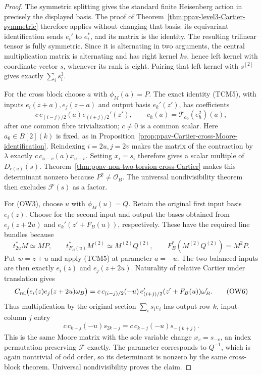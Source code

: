 \begin{proof}
The symmetric splitting gives the standard finite Heisenberg action
in precisely the displayed basis.  The proof of
Theorem~\ref{thm:ppav-level3-Cartier-symmetric} therefore applies
without changing that basis: its equivariant identification sends
\(e_i'\) to \(e_i^*\), and its matrix is the identity.  The resulting
trilinear tensor is fully symmetric.  Since it is alternating in
two arguments, the central multiplication matrix is alternating and
has right kernel \(ks\), hence left kernel with coordinate vector
\(s\), whenever its rank is eight.  Pairing that left kernel with
\(s^{[2]}\) gives exactly \(\sum_i s_i^3\).

For the cross block choose \(a\) with \(\phi_M(a)=P\).  The exact
identity (TCM5), with inputs \(e_i(z+a),e_j(z-a)\) and output basis
\(e_k'(z')\), has coefficients
\[
 c\,c_{(i-j)/2}(a)e_{(i+j)/2}'(z'),
 \qquad
 c_h(a)=\mathcal T_{a_0}(e_h^2)(a),
 \tag{OW4}
\]
after one common fibre trivialization; \(c\ne0\) is a common scalar.
Here \(a_0\in B[2](k)\) is fixed, as in
Proposition~\ref{prop:ppav-Cartier-cross-Moore-identification}.
Reindexing \(i=2u,j=2v\) makes the matrix of the contraction by
\(\lambda\) exactly \(c\,c_{u-v}(a)x_{u+v}\).  Setting \(x_i=s_i\)
therefore gives a scalar multiple of \(D_{c(a)}(s)\).
Theorem~\ref{thm:ppav-non-two-torsion-cross-Cartier} makes this
determinant nonzero because \(P^2\ne\mathcal O_B\).  The universal
nondivisibility theorem then excludes \(\mathcal F(s)\) as a factor.

For (OW3), choose \(u\) with \(\phi_M(u)=Q\).  Retain the original
first input basis \(e_i(z)\).  Choose for the second input and output
the bases obtained from \(e_j(z+2u)\) and
\(e_k'(z'+F_B(u))\), respectively.  These have the required line
bundles because
\[
 t_{2u}^*M\simeq MP,\qquad
 t_{F_B(u)}^*M^{(2)}\simeq M^{(2)}Q^{(2)},\qquad
 F_B^*(M^{(2)}Q^{(2)})=M^2P.
 \tag{OW5}
\]
Put \(w=z+u\) and apply (TCM5) at parameter \(a=-u\).
The two balanced inputs are then exactly \(e_i(z)\) and
\(e_j(z+2u)\).  Naturality of relative Cartier under translation
gives
\[
 C_{\rm rel}\bigl(e_i(z)e_j(z+2u)\omega_B\bigr)
 =c\,c_{(i-j)/2}(-u)\,
       e_{(i+j)/2}'(z'+F_B(u))\omega_B'.
 \tag{OW6}
\]
Thus multiplication by the original section \(\sum_i s_i e_i\)
has output-row \(k\), input-column \(j\) entry
\[
 c\,c_{k-j}(-u)s_{2k-j}
     =c\,c_{k-j}(-u)s_{-(k+j)}.
 \tag{OW7}
\]
This is the same Moore matrix with the sole variable change
\(x_v=s_{-v}\), an index permutation preserving \(\mathcal F\)
exactly.  The parameter corresponds to \(Q^{-1}\), which is again
nontrivial of odd order, so its determinant is nonzero by the same
cross-block theorem.  Universal nondivisibility proves the claim.


\end{proof}
